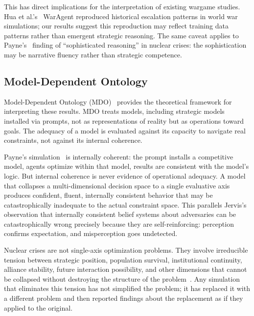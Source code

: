 \documentclass[manuscript, review=true, anonymous=true]{acmart}
\begin{document}
This has direct implications for the interpretation of existing wargame studies.
Hua et al.'s~\cite{hua2023waragent} WarAgent reproduced historical escalation patterns in world war simulations; our results suggest this reproduction may reflect training data patterns rather than emergent strategic reasoning.
The same caveat applies to Payne's~\cite{payne2026ai} finding of ``sophisticated reasoning'' in nuclear crises: the sophistication may be narrative fluency rather than strategic competence.

\subsection{Model-Dependent Ontology}

Model-Dependent Ontology (MDO)~\cite{delaflor2024introduction,delaflor2025multi} provides the theoretical framework for interpreting these results.
MDO treats models, including strategic models installed via prompts, not as representations of reality but as operations toward goals.
The adequacy of a model is evaluated against its capacity to navigate real constraints, not against its internal coherence.

Payne's simulation~\cite{payne2026ai} is internally coherent: the prompt installs a competitive model, agents optimize within that model, results are consistent with the model's logic.
But internal coherence is never evidence of operational adequacy.
A model that collapses a multi-dimensional decision space to a single evaluative axis produces confident, fluent, internally consistent behavior that may be catastrophically inadequate to the actual constraint space.
This parallels Jervis's~\cite{jervis1976perception} observation that internally consistent belief systems about adversaries can be catastrophically wrong precisely because they are self-reinforcing: perception confirms expectation, and misperception goes undetected.

Nuclear crises are not single-axis optimization problems.
They involve irreducible tension between strategic position, population survival, institutional continuity, alliance stability, future interaction possibility, and other dimensions that cannot be collapsed without destroying the structure of the problem~\cite{allison1971essence,fearon1995rationalist}.
Any simulation that eliminates this tension has not simplified the problem; it has replaced it with a different problem and then reported findings about the replacement as if they applied to the original.
\end{document}
